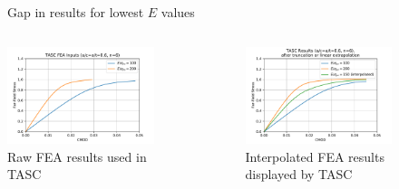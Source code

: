 \begin{frame}
\begin{columns}
\begin{column}{0.45\textwidth}
\begin{figure}[tbp]
\caption{Gap in results for lowest \(E\) values}
\end{figure}
\end{column}
\end{columns}
\end{frame}

\begin{frame}
\begin{columns}
\begin{column}{0.45\textwidth}
\begin{figure}[bp]
\centering
\includegraphics[width=\columnwidth]{tasc-inputs}
\caption{\label{fig:tasc_fea_inputs} Raw FEA results used in TASC}
\end{figure}
\end{column}
\begin{column}{0.45\textwidth}
\begin{figure}[tbp]
\centering
\includegraphics[width=\columnwidth]{tasc-results}
\caption{\label{fig:tasc_interp_outputs} Interpolated FEA results displayed by TASC}
\end{figure}
\end{column}
\end{columns}
\end{frame}

